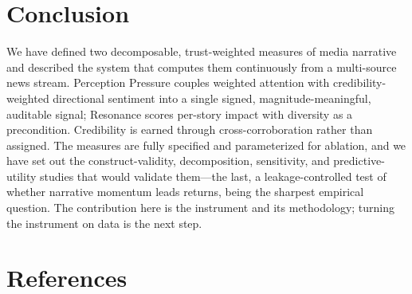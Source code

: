 \documentclass[11pt,a4paper]{article}
\theoremstyle{definition}
\begin{document}
\section{Conclusion}
\label{sec:conclusion}

We have defined two decomposable, trust-weighted measures of media narrative and described the system
that computes them continuously from a multi-source news stream. Perception Pressure couples weighted
attention with credibility-weighted directional sentiment into a single signed, magnitude-meaningful,
auditable signal; Resonance scores per-story impact with diversity as a precondition. Credibility is
earned through cross-corroboration rather than assigned. The measures are fully specified and
parameterized for ablation, and we have set out the construct-validity, decomposition, sensitivity,
and predictive-utility studies that would validate them---the last, a leakage-controlled test of
whether narrative momentum leads returns, being the sharpest empirical question. The contribution
here is the instrument and its methodology; turning the instrument on data is the next step.

\section*{References}
\end{document}
